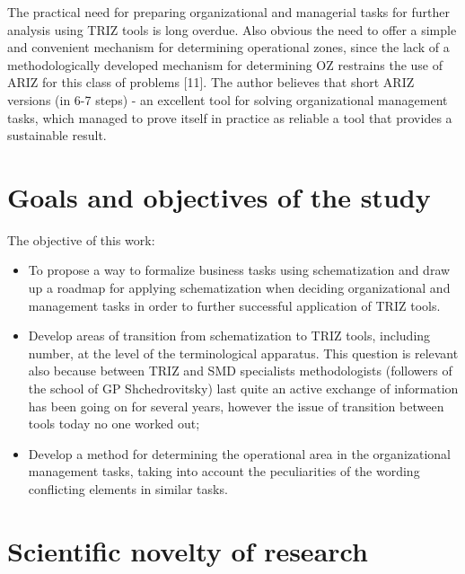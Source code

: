 \documentclass[11pt,a4paper]{book}
\begin{document}
The practical need for preparing organizational and managerial tasks for
further analysis using TRIZ tools is long overdue. Also obvious the need to
offer a simple and convenient mechanism for determining operational zones,
since the lack of a methodologically developed mechanism for determining OZ
restrains the use of ARIZ for this class of problems [11]. The author believes
that short ARIZ versions (in 6-7 steps) - an excellent tool for solving
organizational management tasks, which managed to prove itself in practice as
reliable a tool that provides a sustainable result.

\section{Goals and objectives of the study}
The objective of this work:
\begin{itemize}
\item To propose a way to formalize business tasks using schematization and
  draw up a roadmap for applying schematization when deciding organizational
  and management tasks in order to further successful application of TRIZ
  tools.
\item Develop areas of transition from schematization to TRIZ tools, including
  number, at the level of the terminological apparatus. This question is
  relevant also because between TRIZ and SMD specialists methodologists
  (followers of the school of GP Shchedrovitsky) last quite an active exchange
  of information has been going on for several years, however the issue of
  transition between tools today no one worked out;
\item Develop a method for determining the operational area in the
  organizational management tasks, taking into account the peculiarities of
  the wording conflicting elements in similar tasks.
\end{itemize}

\section{Scientific novelty of research}
\end{document}
